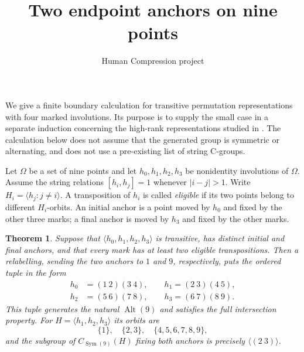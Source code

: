 \documentclass[11pt]{article}
\title{Two endpoint anchors on nine points}
\author{Human Compression project}
\date{}
\newtheorem{theorem}{Theorem}
\newcommand{\Sym}{\operatorname{Sym}}
\newcommand{\Alt}{\operatorname{Alt}}
\newcommand{\gen}[1]{\langle #1\rangle}
\begin{document}
\maketitle
\noindent We give a finite boundary calculation for transitive permutation
representations with four marked involutions. Its purpose is to supply the
small case in a separate induction concerning the high-rank representations
studied in \cite{CFL}. The calculation below does not assume that the generated
group is symmetric or alternating, and does not use a pre-existing list of
string C-groups.

Let $\Omega$ be a set of nine points and let $h_0,h_1,h_2,h_3$ be nonidentity
involutions of $\Omega$. Assume the string relations
$[h_i,h_j]=1$ whenever $|i-j|>1$. Write
$H_i=\gen{h_j:j\ne i}$. A transposition of $h_i$ is called \emph{eligible}
if its two points belong to different $H_i$-orbits. An initial anchor is a
point moved by $h_0$ and fixed by the other three marks; a final anchor is
moved by $h_3$ and fixed by the other marks.

\begin{theorem}\label{main}
Suppose that $\gen{h_0,h_1,h_2,h_3}$ is transitive, has distinct initial and
final anchors, and that every mark has at least two eligible transpositions.
Then a relabelling, sending the two anchors to $1$ and $9$, respectively,
puts the ordered tuple in the form
\begin{equation}\label{path}
\begin{split}
h_0&=(1\ 2)(3\ 4),\qquad h_1=(2\ 3)(4\ 5),\\
h_2&=(5\ 6)(7\ 8),\qquad h_3=(6\ 7)(8\ 9).
\end{split}
\end{equation}
This tuple generates the natural $\Alt(9)$ and satisfies the full intersection
property. For $H=\gen{h_1,h_2,h_3}$ its orbits are
\begin{equation}\label{orbits}
\{1\},\quad\{2,3\},\quad\{4,5,6,7,8,9\},
\end{equation}
and the subgroup of $C_{\Sym(9)}(H)$ fixing both anchors is precisely
$\gen{(2\ 3)}$.
\end{theorem}
\end{document}
